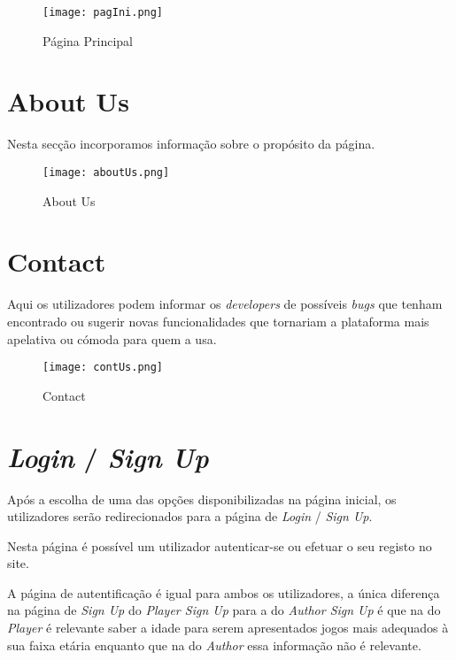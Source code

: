 \documentclass[11pt,a4paper]{report}
\begin{document}
\begin{figure}[h]
    \centering
    \texttt{[image: pagIni.png]}
    \caption{Página Principal}
    \label{fig:pagIni}
\end{figure}

\newpage

\section{About Us}

Nesta secção incorporamos informação sobre o propósito da página.\newline

\begin{figure}[h]
    \centering
    \texttt{[image: aboutUs.png]}
    \caption{About Us}
    \label{fig:abUs}
\end{figure}

\section{Contact}

Aqui os utilizadores podem informar os \emph{developers} de possíveis \emph{bugs} que tenham encontrado ou sugerir novas funcionalidades que tornariam a plataforma mais apelativa ou cómoda para quem a usa.

\begin{figure}[h]
    \centering
    \texttt{[image: contUs.png]}
    \caption{Contact}
    \label{fig:cont}
\end{figure}

\newpage

\section{\emph{Login} / \emph{Sign Up}}
Após a escolha de uma das opções disponibilizadas na página inicial, os utilizadores serão redirecionados para a página de \emph{Login} / \emph{Sign Up}. 

Nesta página é possível um utilizador autenticar-se ou efetuar o seu registo no site. 

A página de autentificação é igual para ambos os utilizadores, a única diferença na página de \emph{Sign Up} do \emph{Player Sign Up} para a do \emph{Author Sign Up} é que na do \emph{Player} é relevante saber a idade para serem apresentados jogos mais adequados à sua faixa etária enquanto que na do \emph{Author} essa informação não é relevante.\newline\newline
\end{document}
